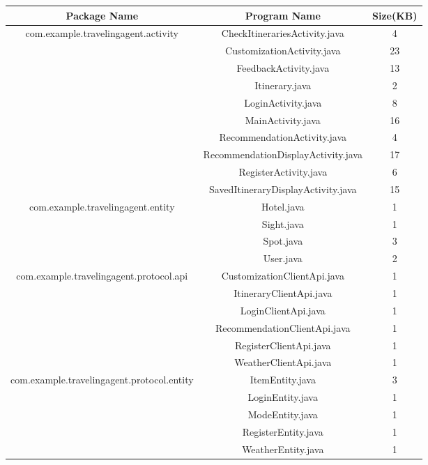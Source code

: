 \documentclass[10pt]{article}
\begin{document}
\begin{table}[htb]
	\centering
	\begin{tabular}{|c|c|c|}
		\hline
		Package Name&Program Name &Size(KB)\\
		\hline
		\multirow{4}{*}{com.example.travelingagent.activity}
		&CheckItinerariesActivity.java &4 \\
		\cline{2-3}
		&CustomizationActivity.java &23 \\
		\cline{2-3}
		&FeedbackActivity.java &13 \\
		\cline{2-3}
		&Itinerary.java &2 \\
		\cline{2-3}
		&LoginActivity.java &8 \\
		\cline{2-3}
		&MainActivity.java &16 \\
		\cline{2-3}
		&RecommendationActivity.java &4 \\
		\cline{2-3}
		&RecommendationDisplayActivity.java &17 \\
		\cline{2-3}
		&RegisterActivity.java &6 \\
		\cline{2-3}
		&SavedItineraryDisplayActivity.java &15 \\
		\hline
		
		\multirow{4}{*}{com.example.travelingagent.entity}
		&Hotel.java &1 \\
		\cline{2-3}
		&Sight.java &1 \\
		\cline{2-3}
		&Spot.java &3 \\
		\cline{2-3}
		&User.java &2 \\
		\hline
		
		\multirow{4}{*}{com.example.travelingagent.protocol.api}
		&CustomizationClientApi.java &1 \\
		\cline{2-3}
		&ItineraryClientApi.java &1 \\
		\cline{2-3}
		&LoginClientApi.java &1 \\
		\cline{2-3}
		&RecommendationClientApi.java &1 \\
		\cline{2-3}
		&RegisterClientApi.java &1 \\
		\cline{2-3}
		&WeatherClientApi.java &1 \\
		\hline
		
		\multirow{4}{*}{com.example.travelingagent.protocol.entity}
		&ItemEntity.java &3 \\
		\cline{2-3}
		&LoginEntity.java &1 \\
		\cline{2-3}
		&ModeEntity.java &1 \\
		\cline{2-3}
		&RegisterEntity.java &1 \\
		\cline{2-3}
		&WeatherEntity.java &1 \\
		\hline
		

\end{tabular}
\end{table}
\end{document}
